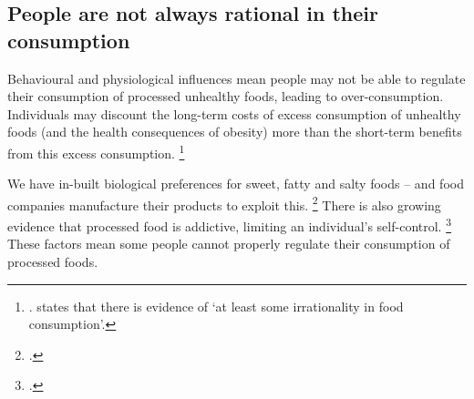 \documentclass[embargoed]{grattan}
\begin{document}
\subsection{People are not always rational in their consumption}\label{people-are-not-always-rational-in-their-consumption}


Behavioural and physiological influences mean people may not be able to regulate their consumption of processed unhealthy foods, leading to over-consumption.
Individuals may discount the long-term costs of excess consumption of unhealthy foods (and the health consequences of obesity) more than the short-term benefits from this excess consumption.%
\footnote{\textcites{CnossenExcisetaxationAustralia}{Cawley2015economyscalesselective}{Gruber2004Taxincidencewhen}. \textcite{Ruhm2012Understandingovereatingobesity} states that there is evidence of `at least some irrationality in food consumption'.}

We have in-built biological preferences for sweet, fatty and salty foods -- and food companies manufacture their products to exploit this.%
\footcites{Moss2013ExtraordinaryScienceAddictive}{Ruhm2012Understandingovereatingobesity} There is also growing evidence that processed food is addictive, limiting an individual's self-control.%
\footcites{Panel2014POLICYBRIEFoptions}{Gearhardt2009PreliminaryvalidationYale}{Ifland2009Refinedfoodaddiction}{Karnani2016ObesityCrisisas}{Lennerz2013Effectsdietaryglycemic}{Schulte2015Currentconsiderationsregarding} These factors mean some people cannot properly regulate their consumption of processed foods.
\end{document}
